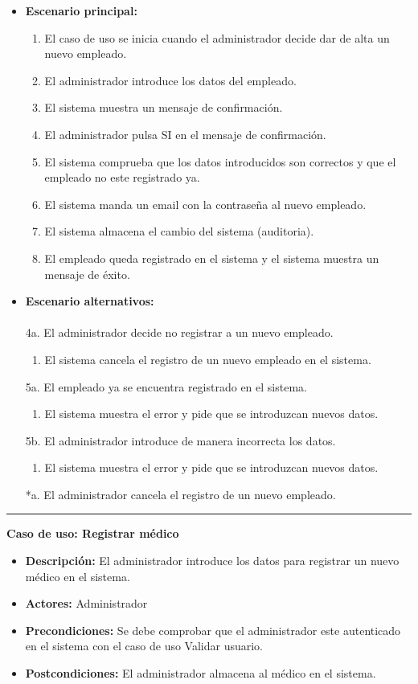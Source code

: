 \begin{itemize}\renewcommand{\labelitemi}{$\circ$}
 \item \textbf{Escenario principal:}
         \begin{enumerate}
          \item El caso de uso se inicia cuando el administrador decide dar de alta un nuevo empleado.
          \item El administrador introduce los datos del empleado.
  	  \item El sistema muestra un mensaje de confirmación.
          \item El administrador pulsa SI en el mensaje de confirmación.
          \item El sistema comprueba que los datos introducidos son correctos y que el empleado no este registrado ya.
       	  \item El sistema manda un email con la contraseña al nuevo empleado.
 	  \item El sistema almacena el cambio del sistema (auditoria).
          \item El empleado queda registrado en el sistema y el sistema muestra un mensaje de éxito.
         \end{enumerate}
  \item \textbf{Escenario alternativos:}\\\\
	4a. El administrador decide no registrar a un nuevo empleado.
	      \begin{enumerate}
	       \item El sistema cancela el registro de un nuevo empleado en el sistema.
	      \end{enumerate}
         5a. El empleado ya se encuentra registrado en el sistema.
	      \begin{enumerate}
	       \item El sistema muestra el error y pide que se introduzcan nuevos datos.
	      \end{enumerate}
           5b. El administrador introduce de manera incorrecta los datos.
		\begin{enumerate}
		 \item El sistema muestra el error y pide que se introduzcan nuevos datos.
		\end{enumerate}
          *a. El administrador cancela el registro de un nuevo empleado.
\end{itemize}
\smallskip
\hrule height 1pt
\smallskip
\textbf{Caso de uso: Registrar médico}
\begin{itemize}\renewcommand{\labelitemi}{$\cdot$}
 \item \textbf{Descripción:} El administrador introduce los datos para registrar un nuevo médico en el sistema.
  \item \textbf{Actores:} Administrador
  \item \textbf{Precondiciones:} Se debe comprobar que el administrador este autenticado en el sistema con el caso de uso Validar usuario.
  \item \textbf{Postcondiciones:} El administrador almacena al médico en el sistema.
\end{itemize}
